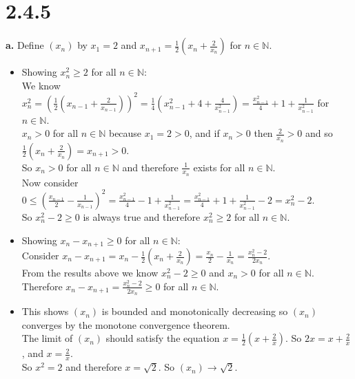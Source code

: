 \documentclass{article}
\begin{document}
\newpage
\section*{2.4.5}

{\Large \textbf{a.}} Define $(x_n)$ by $x_1 = 2$ and $x_{n+1} = \frac{1}{2} (x_n + \frac{2}{x_n})$ for $n\in\mathbb{N}$.
\begin{center}
    \doublespacing
    \begin{itemize}
        \item Showing $x_n^2\geq 2$ for all $n\in\mathbb{N}$:
        \\We know {\large $x_n^2 = (\frac{1}{2} (x_{n-1} +\frac{2}{x_{n-1}}))^2 =\frac{1}{4} (x_{n-1}^2 + 4 +\frac{4}{x_{n-1}^2}) =\frac{x_{n-1}^2}{4} + 1 +\frac{1}{x_{n-1}^2}$} for $n\in\mathbb{N}$.
        \\$x_n > 0$ for all $n\in\mathbb{N}$ because $x_1 = 2 > 0$, and if $x_n > 0$ then $\frac{2}{x_n} > 0$ and so $\frac{1}{2} (x_n + \frac{2}{x_n}) = x_{n+1} > 0$.
        \\So $x_n > 0$ for all $n\in\mathbb{N}$ and therefore $\frac{1}{x_n}$ exists for all $n\in\mathbb{N}$.
        \\Now consider $0\leq (\frac{x_{n-1}}{2} -\frac{1}{x_{n-1}})^2 = \frac{x_{n-1}^2}{4} - 1 +\frac{1}{x_{n-1}^2} = \frac{x_{n-1}^2}{4} + 1 +\frac{1}{x_{n-1}^2} - 2 = x_{n}^2 - 2$.
        \\So $x_{n}^2 - 2\geq 0$ is always true and therefore $x_{n}^2\geq 2$ for all $n\in\mathbb{N}$.
        \item Showing $x_n - x_{n+1}\geq 0$ for all $n\in\mathbb{N}$:
        \\Consider {\large $x_n - x_{n+1} = x_n - \frac{1}{2} (x_n + \frac{2}{x_n}) = \frac{x_n}{2} -\frac{1}{x_n} =\frac{x_n^2 - 2}{2 x_n}$}.
        \\From the results above we know $x_{n}^2 - 2\geq 0$ and $x_n > 0$ for all $n\in\mathbb{N}$.
        \\Therefore $x_n - x_{n+1} = \frac{x_n^2 - 2}{2 x_n}\geq 0$ for all $n\in\mathbb{N}$.
        \item This shows $(x_n)$ is bounded and monotonically decreasing so $(x_n)$ converges by the monotone convergence theorem.
        \\The limit of $(x_n)$ should satisfy the equation $x =\frac{1}{2} (x +\frac{2}{x})$. So $2x = x +\frac{2}{x}$, and $x =\frac{2}{x}$.
        \\So $x^2 = 2$ and therefore $x =\sqrt{2}$. So $(x_n)\rightarrow\sqrt{2}$.
    \end{itemize}
\end{center}
\end{document}
